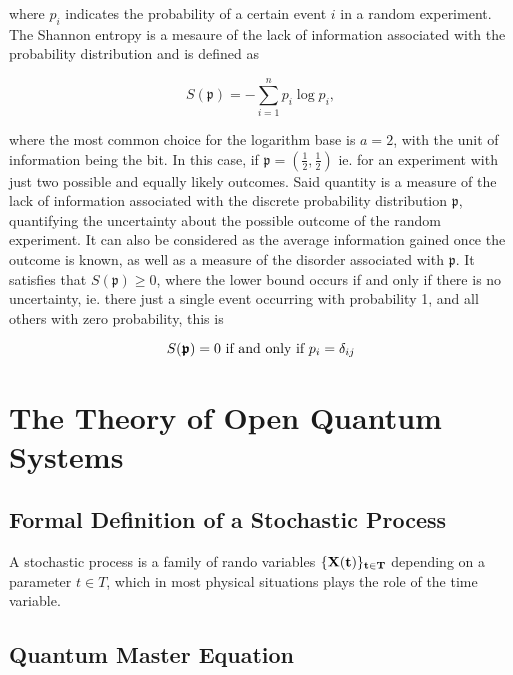 \documentclass{homework}
\begin{document}
where $p_i$ indicates the probability of a certain event $i$ in a random experiment. The Shannon entropy is a mesaure of the lack of information associated with the probability distribution and is defined as 

\begin{equation}
    S(\bm{\mathfrak{p}}) = - \sum_{i=1}^{n} p_i \log p_i,
\end{equation}

where the most common choice for the logarithm base is $a=2$, with the unit of information being the bit. In this case, if $\bm{\mathfrak{p}} = \left(\frac{1}{2},\frac{1}{2}\right)$ ie. for an experiment with just two possible and equally likely outcomes. Said quantity is a measure of the lack of information associated with the discrete probability distribution $\bm{\mathfrak{p}}$, quantifying the uncertainty about the possible outcome of the random experiment. It can also be considered as the average information gained once the outcome is known, as well as a measure of the disorder associated with $\bm{\mathfrak{p}}$. It satisfies that $S(\bm{\mathfrak{p}}) \geq 0$, where the lower bound occurs if and only if there is no uncertainty, ie. there just a single event occurring with probability 1, and all others with zero probability, this is 

\begin{equation}
    S(\bm{\mathfrak{p}}) = 0 \textnormal{ if and only if } p_i = \delta_{ij}
\end{equation}

\clearpage

\section{The Theory of Open Quantum Systems}

\subsection{Formal Definition of a Stochastic Process}

A stochastic process is a family of rando variables $\{\bf X(t)\}_{t \in T}$ depending on a parameter $t \in T$, which in most physical situations plays the role of the time variable. 

\clearpage

\subsection{Quantum Master Equation}
\end{document}
